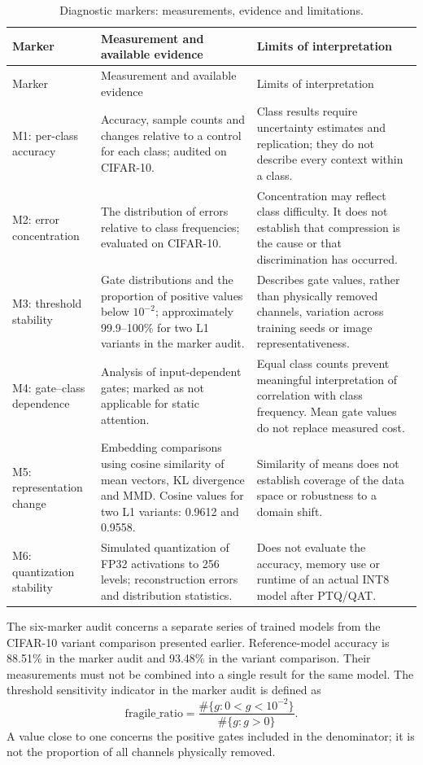 \documentclass[12pt,a4paper]{article}
\begin{document}
\begingroup\small
\begin{longtable}{@{}p{}p{}p{}@{}}
\caption{Diagnostic markers: measurements, evidence and limitations.}\\
\toprule
Marker & Measurement and available evidence & Limits of interpretation \\
\midrule
\endfirsthead
\toprule
Marker & Measurement and available evidence & Limits of interpretation \\
\midrule
\endhead
M1: per-class accuracy & Accuracy, sample counts and changes relative
to a control for each class; audited on CIFAR-10. & Class results require
uncertainty estimates and replication; they do not describe every
context within a class. \\
M2: error concentration & The distribution of errors relative to class
frequencies; evaluated on CIFAR-10. & Concentration may reflect class
difficulty. It does not establish that compression is the cause
or that discrimination has occurred. \\
M3: threshold stability & Gate distributions and the proportion of positive
values below $10^{-2}$; approximately 99.9--100\% for two L1 variants
in the marker audit. & Describes gate values, rather than physically
removed channels, variation across training seeds or image
representativeness. \\
M4: gate--class dependence & Analysis of input-dependent gates;
marked as not applicable for static attention. & Equal class counts
prevent meaningful interpretation of correlation with class frequency.
Mean gate values do not replace measured cost. \\
M5: representation change & Embedding comparisons using cosine similarity
of mean vectors, KL divergence and MMD. Cosine values for two L1 variants:
0.9612 and 0.9558. & Similarity of means does not establish coverage
of the data space or robustness to a domain shift. \\
M6: quantization stability & Simulated quantization of FP32 activations
to 256 levels; reconstruction errors and distribution statistics.
& Does not evaluate the accuracy, memory use or runtime of an actual
INT8 model after PTQ/QAT. \\
\bottomrule
\end{longtable}
\endgroup

The six-marker audit concerns a separate series of trained models
from the CIFAR-10 variant comparison presented earlier.
Reference-model accuracy is 88.51\% in the marker audit and 93.48\%
in the variant comparison. Their measurements must not be combined
into a single result for the same model.
The threshold sensitivity indicator in the marker audit is defined as
\begin{equation}
\mathrm{fragile\_ratio}=
\frac{\#\{g:0<g<10^{-2}\}}{\#\{g:g>0\}}.
\end{equation}
A value close to one concerns the positive gates included in the
denominator; it is not the proportion of all channels physically removed.
\end{document}
